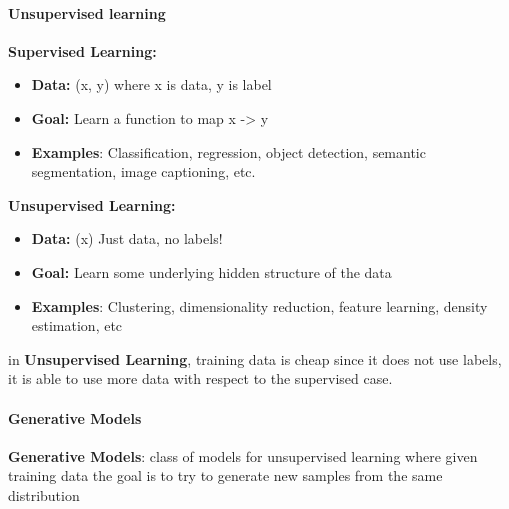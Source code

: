 \documentclass[11pt]{article}
\begin{document}
\paragraph{Unsupervised learning}
\textbf{Supervised Learning:}
\begin{itemize}
    \item \textbf{Data:} (x, y) where x is data, y is label
    \item \textbf{Goal:} Learn a function to map x -> y
    \item \textbf{Examples}: Classification, regression, object detection, semantic segmentation, image captioning, etc.
\end{itemize}{}
\textbf{Unsupervised Learning:}
\begin{itemize}
    \item \textbf{Data:} (x) Just data, no labels!
    \item \textbf{Goal:} Learn some underlying hidden structure of the data
    \item \textbf{Examples}: Clustering, dimensionality reduction, feature learning, density estimation, etc
\end{itemize}{}
in \textbf{Unsupervised Learning}, training data is cheap since it does not use labels, it is able to use more data with respect to the supervised case.
\paragraph{Generative Models}
\textbf{Generative Models}: class of models for unsupervised learning where given training data the goal is to try to generate new samples from the same distribution
\end{document}

